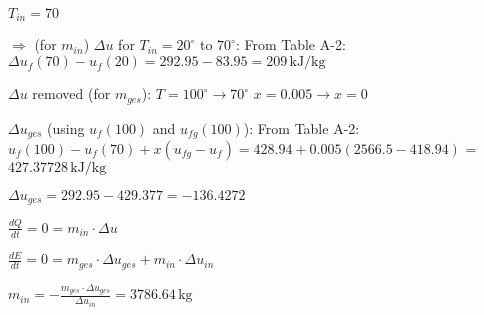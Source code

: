 \( T_{in} = 70 \)  

\( \Rightarrow \) (for \( m_{in} \)) \( \Delta u \) for \( T_{in} = 20^\circ \) to \( 70^\circ \):  
From Table A-2:  
\( \Delta u_f(70) - u_f(20) = 292.95 - 83.95 = 209 \, \text{kJ/kg} \)  

\( \Delta u \) removed (for \( m_{ges} \)):  
\( T = 100^\circ \rightarrow 70^\circ \)  
\( x = 0.005 \rightarrow x = 0 \)  

\( \Delta u_{ges} \) (using \( u_{f}(100) \) and \( u_{fg}(100) \)):  
From Table A-2:  
\( u_{f}(100) - u_f(70) + x(u_{fg} - u_f) = 428.94 + 0.005(2566.5 - 418.94) \)  
= \( 427.37728 \, \text{kJ/kg} \)  

\( \Delta u_{ges} = 292.95 - 429.377 = -136.4272 \)  

\( \frac{dQ}{dt} = 0 = m_{in} \cdot \Delta u \)  

\( \frac{dE}{dt} = 0 = m_{ges} \cdot \Delta u_{ges} + m_{in} \cdot \Delta u_{in} \)  

\( m_{in} = -\frac{m_{ges} \cdot \Delta u_{ges}}{\Delta u_{in}} = 3786.64 \, \text{kg} \)